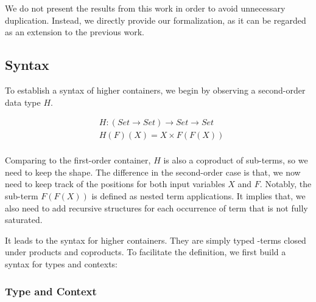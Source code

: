 We do not present the results from this work in order to avoid unnecessary duplication. Instead, we directly provide our formalization, as it can be regarded as an extension to the previous work.

\subsection{Syntax}

To establish a syntax of higher containers, we begin by observing a second-order data type $H$.

\begin{align*}
& H : (Set \to Set) \to Set \to Set \\
& H (F) (X) = X \times F (F (X)) \\
\end{align*}

Comparing to the first-order container, $H$ is also a coproduct of sub-terms, so we need to keep the shape. The difference in the second-order case is that, we now need to keep track of the positions for both input variables $X$ and $F$. Notably, the sub-term $F(F(X))$ is defined as nested term applications. It implies that, we also need to add recursive structures for each occurrence of term that is not fully saturated.

It leads to the syntax for higher containers. They are simply typed \lambda-terms closed under products and coproducts. To facilitate the definition, we first build a syntax for types and contexts:

\subsubsection*{Type and Context}

\begin{code}%
\>[0]\AgdaSpace{}%
\AgdaSpace{}%
\AgdaSymbol{:}\AgdaSpace{}%
\AgdaSpace{}%
\<%
\\
\>[0][@{}l@{\AgdaIndent{0}}]%
\>[2]\AgdaInductiveConstructor{*}\AgdaSpace{}%
\AgdaSymbol{:}\AgdaSpace{}%
\<%
\\
%
\>[2]\AgdaSpace{}%
\AgdaSymbol{:}\AgdaSpace{}%
\AgdaSpace{}%
\AgdaSpace{}%
\AgdaSpace{}%
\AgdaSpace{}%
\<%
\\
%
\\[\AgdaEmptyExtraSkip]%
\>[0]\AgdaSpace{}%
\AgdaSpace{}%
\AgdaSymbol{:}\AgdaSpace{}%
\AgdaSpace{}%
\<%
\\
\>[0][@{}l@{\AgdaIndent{0}}]%
\>[2]%
\>[6]\AgdaSymbol{:}\AgdaSpace{}%
\<%
\\
%
\>[2]\AgdaSpace{}%
\AgdaSymbol{:}\AgdaSpace{}%
\AgdaSpace{}%
\AgdaSpace{}%
\AgdaSpace{}%
\AgdaSpace{}%
\<%
\end{code}

